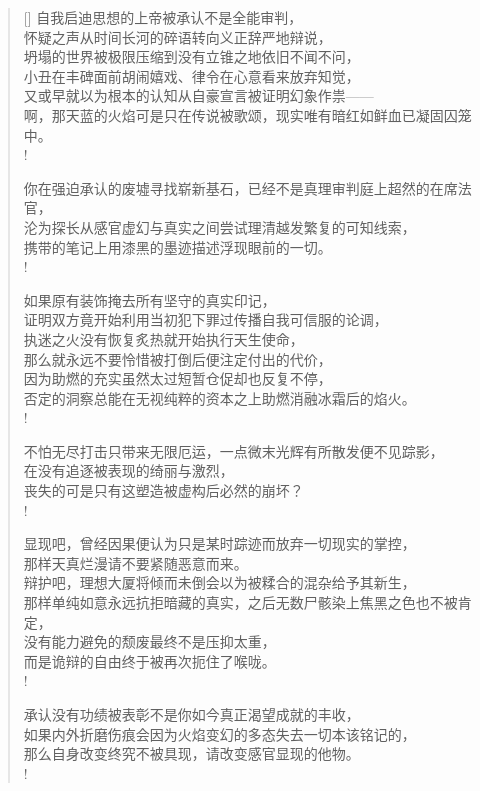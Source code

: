 \documentclass[UTF8, 12pt, a4paper]{ctexrep} %
\begin{document}
\begin{verse}[\versewidth]
自我启迪思想的上帝被承认不是全能审判，\\
怀疑之声从时间长河的碎语转向义正辞严地辩说，\\
坍塌的世界被极限压缩到没有立锥之地依旧不闻不问，\\
小丑在丰碑面前胡闹嬉戏、律令在心意看来放弃知觉，\\
又或早就以为根本的认知从自豪宣言被证明幻象作祟——\\
啊，那天蓝的火焰可是只在传说被歌颂，现实唯有暗红如鲜血已凝固囚笼中。\\!

你在强迫承认的废墟寻找崭新基石，已经不是真理审判庭上超然的在席法官，\\
沦为探长从感官虚幻与真实之间尝试理清越发繁复的可知线索，\\
携带的笔记上用漆黑的墨迹描述浮现眼前的一切。\\!

如果原有装饰掩去所有坚守的真实印记，\\
证明双方竟开始利用当初犯下罪过传播自我可信服的论调，\\
执迷之火没有恢复炙热就开始执行天生使命，\\
那么就永远不要怜惜被打倒后便注定付出的代价，\\
因为助燃的充实虽然太过短暂仓促却也反复不停，\\
否定的洞察总能在无视纯粹的资本之上助燃消融冰霜后的焰火。\\!

不怕无尽打击只带来无限厄运，一点微末光辉有所散发便不见踪影，\\
在没有追逐被表现的绮丽与激烈，\\
丧失的可是只有这塑造被虚构后必然的崩坏？\\!

显现吧，曾经因果便认为只是某时踪迹而放弃一切现实的掌控，\\
那样天真烂漫请不要紧随恶意而来。\\
辩护吧，理想大厦将倾而未倒会以为被糅合的混杂给予其新生，\\
那样单纯如意永远抗拒暗藏的真实，之后无数尸骸染上焦黑之色也不被肯定，\\
没有能力避免的颓废最终不是压抑太重，\\
而是诡辩的自由终于被再次扼住了喉咙。\\!

承认没有功绩被表彰不是你如今真正渴望成就的丰收，\\
如果内外折磨伤痕会因为火焰变幻的多态失去一切本该铭记的，\\
那么自身改变终究不被具现，请改变感官显现的他物。\\!


\end{verse}
\end{document}
